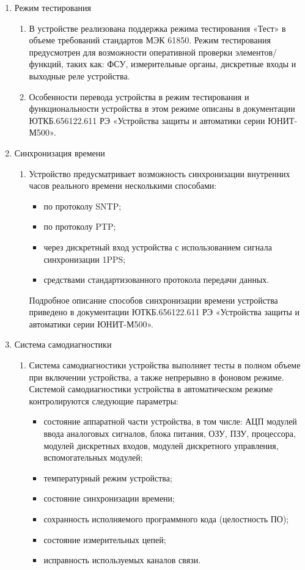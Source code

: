 \documentclass[a4paper, 12pt, table, hidelinks, DIV=calc]{extarticle}
\def\ManualUnitGeneral{ЮТКБ.656122.611 РЭ «Устройства защиты и автоматики серии ЮНИТ-М500»}
\begin{document}
\begin{enumerate}[label=\arabic{section}.\arabic{subsection}.\arabic*, labelsep=7pt, leftmargin=0pt, itemindent=60pt, align=left]
\item Режим тестирования
\begin{enumerate}

\item 
В устройстве реализована поддержка режима тестирования «Тест» в объеме требований стандартов МЭК 61850.
Режим тестирования предусмотрен для возможности оперативной проверки элементов/функций, таких как: ФСУ, измерительные органы, дискретные входы и выходные реле устройства.

\item 
Особенности перевода устройства в режим тестирования и функциональности устройства в этом режиме описаны в документации \ManualUnitGeneral.

\end{enumerate}

\item Синхронизация времени
\begin{enumerate}

\item
Устройство предусматривает возможность синхронизации внутренних часов реального времени несколькими способами:
\begin{itemize}
\item по протоколу SNTP;
\item по протоколу PTP;
\item через дискретный вход устройства с использованием сигнала синхронизации 1PPS;
\item {средствами стандартизованного протокола передачи данных.}
\end{itemize}
Подробное описание способов синхронизации времени устройства приведено в документации \ManualUnitGeneral.

\end{enumerate}

\item Система самодиагностики
\begin{enumerate}

\item
Система самодиагностики устройства выполняет тесты в полном объеме при включении устройства, а также непрерывно в фоновом режиме.
Системой самодиагностики устройства в автоматическом режиме контролируются следующие параметры:
\begin{itemize}
\item состояние аппаратной части устройства, в том числе: АЦП модулей ввода аналоговых сигналов, блока питания, ОЗУ, ПЗУ, процессора, модулей дискретных входов, модулей дискретного управления, вспомогательных модулей;
\item температурный режим устройства;
\item состояние синхронизации времени;
\item сохранность исполняемого программного кода (целостность ПО);
\item состояние измерительных цепей;
\item исправность используемых каналов связи.
\end{itemize}


\end{enumerate}
\end{enumerate}
\end{document}
